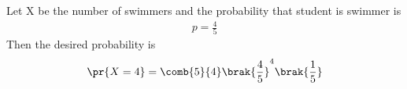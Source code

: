 Let X be the number of swimmers and the probability that student is swimmer is
\begin{align}
p=\frac{4}{5}
\end{align}
%
Then the desired probability is
\begin{align}
\pr{X=4}=\comb{5}{4}\brak{\frac{4}{5}}^4\brak{\frac{1}{5}}
\end{align}
